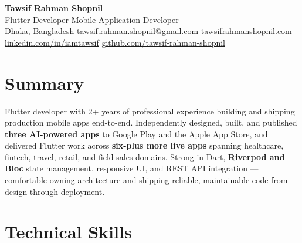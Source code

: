 \documentclass[a4paper,10pt]{article}
\newcommand{\medgap}{\vspace{3pt}}
\begin{document}
\begin{center}
  {\fontsize{17pt}{17pt}\selectfont\textbf{Tawsif Rahman Shopnil}}\\[3pt]
  Flutter Developer \textbar{} Mobile Application Developer\\[3pt]
  Dhaka, Bangladesh \;\textbar\;
  \href{mailto:tawsif.rahman.shopnil@gmail.com}{tawsif.rahman.shopnil@gmail.com} \;\textbar\;
  \href{https://tawsifrahmanshopnil.com}{tawsifrahmanshopnil.com}\\[2pt]
  \href{https://www.linkedin.com/in/iamtawsif}{linkedin.com/in/iamtawsif} \;\textbar\;
  \href{https://github.com/tawsif-rahman-shopnil}{github.com/tawsif-rahman-shopnil}
\end{center}

\medgap

\section*{Summary}
Flutter developer with 2+ years of professional experience building and shipping production mobile apps end-to-end. Independently designed, built, and published \textbf{three AI-powered apps} to Google Play and the Apple App Store, and delivered Flutter work across \textbf{six-plus more live apps} spanning healthcare, fintech, travel, retail, and field-sales domains. Strong in Dart, \textbf{Riverpod and Bloc} state management, responsive UI, and REST API integration --- comfortable owning architecture and shipping reliable, maintainable code from design through deployment.

\medgap

\section*{Technical Skills}
\end{document}

